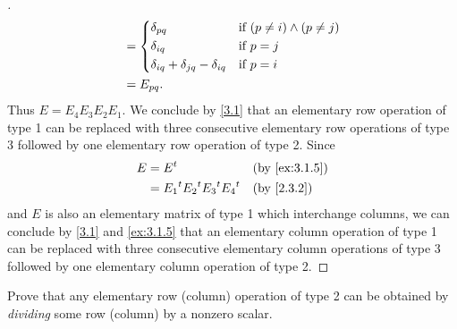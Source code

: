 \begin{proof}[]
\begin{align*}
     & = \begin{dcases}
           \delta_{p q}                               & \text{if } (p \neq i) \land (p \neq j) \\
           \delta_{i q}                               & \text{if } p = j                       \\
           \delta_{i q} + \delta_{j q} - \delta_{i q} & \text{if } p = i
         \end{dcases}                                                                         \\
     & = E_{p q}.
  \end{align*}
  Thus \(E = E_4 E_3 E_2 E_1\).
  We conclude by \cref{3.1} that an elementary row operation of type 1 can be replaced with three consecutive elementary row operations of type 3 followed by one elementary row operation of type 2.
  Since
  \begin{align*}
    E & = \tp{E}                              &  & \text{(by \cref{ex:3.1.5})} \\
      & = \tp{E_1} \tp{E_2} \tp{E_3} \tp{E_4} &  & \text{(by \cref{2.3.2})}
  \end{align*}
  and \(E\) is also an elementary matrix of type 1 which interchange columns, we can conclude by \cref{3.1} and \cref{ex:3.1.5} that an elementary column operation of type 1 can be replaced with three consecutive elementary column operations of type 3 followed by one elementary column operation of type 2.
\end{proof}

\begin{ex}\label{ex:3.1.10}
  Prove that any elementary row (column) operation of type 2 can be obtained by \emph{dividing} some row (column) by a nonzero scalar.
\end{ex}


